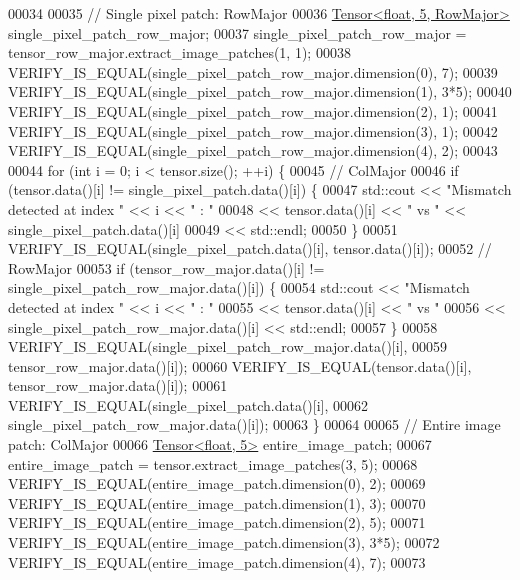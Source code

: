\begin{DoxyCode}
00034 
00035   \textcolor{comment}{// Single pixel patch: RowMajor}
00036   \hyperlink{class_eigen_1_1_tensor}{Tensor<float, 5, RowMajor>} single\_pixel\_patch\_row\_major;
00037   single\_pixel\_patch\_row\_major = tensor\_row\_major.extract\_image\_patches(1, 1);
00038   VERIFY\_IS\_EQUAL(single\_pixel\_patch\_row\_major.dimension(0), 7);
00039   VERIFY\_IS\_EQUAL(single\_pixel\_patch\_row\_major.dimension(1), 3*5);
00040   VERIFY\_IS\_EQUAL(single\_pixel\_patch\_row\_major.dimension(2), 1);
00041   VERIFY\_IS\_EQUAL(single\_pixel\_patch\_row\_major.dimension(3), 1);
00042   VERIFY\_IS\_EQUAL(single\_pixel\_patch\_row\_major.dimension(4), 2);
00043 
00044   \textcolor{keywordflow}{for} (\textcolor{keywordtype}{int} i = 0; i < tensor.size(); ++i) \{
00045     \textcolor{comment}{// ColMajor}
00046     \textcolor{keywordflow}{if} (tensor.data()[i] != single\_pixel\_patch.data()[i]) \{
00047       std::cout << \textcolor{stringliteral}{"Mismatch detected at index "} << i << \textcolor{stringliteral}{" : "}
00048            << tensor.data()[i] << \textcolor{stringliteral}{" vs "} << single\_pixel\_patch.data()[i]
00049            << std::endl;
00050     \}
00051     VERIFY\_IS\_EQUAL(single\_pixel\_patch.data()[i], tensor.data()[i]);
00052     \textcolor{comment}{// RowMajor}
00053     \textcolor{keywordflow}{if} (tensor\_row\_major.data()[i] != single\_pixel\_patch\_row\_major.data()[i]) \{
00054       std::cout << \textcolor{stringliteral}{"Mismatch detected at index "} << i << \textcolor{stringliteral}{" : "}
00055            << tensor.data()[i] << \textcolor{stringliteral}{" vs "}
00056            << single\_pixel\_patch\_row\_major.data()[i] << std::endl;
00057     \}
00058     VERIFY\_IS\_EQUAL(single\_pixel\_patch\_row\_major.data()[i],
00059                     tensor\_row\_major.data()[i]);
00060     VERIFY\_IS\_EQUAL(tensor.data()[i], tensor\_row\_major.data()[i]);
00061     VERIFY\_IS\_EQUAL(single\_pixel\_patch.data()[i],
00062                     single\_pixel\_patch\_row\_major.data()[i]);
00063   \}
00064 
00065   \textcolor{comment}{// Entire image patch: ColMajor}
00066   \hyperlink{class_eigen_1_1_tensor}{Tensor<float, 5>} entire\_image\_patch;
00067   entire\_image\_patch = tensor.extract\_image\_patches(3, 5);
00068   VERIFY\_IS\_EQUAL(entire\_image\_patch.dimension(0), 2);
00069   VERIFY\_IS\_EQUAL(entire\_image\_patch.dimension(1), 3);
00070   VERIFY\_IS\_EQUAL(entire\_image\_patch.dimension(2), 5);
00071   VERIFY\_IS\_EQUAL(entire\_image\_patch.dimension(3), 3*5);
00072   VERIFY\_IS\_EQUAL(entire\_image\_patch.dimension(4), 7);
00073 

\end{DoxyCode}
